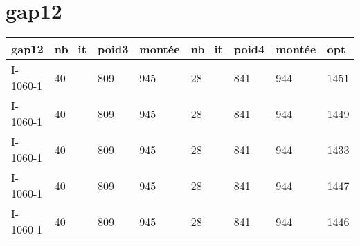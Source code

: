 \documentclass[a4paper,12pt,titlepage]{report}
\begin{document}
\section{gap12}

\begin{tabular}{|l|l|l|l|l|l|l|l|}
  \hline
  gap12 & nb\_it & poid3 & montée & nb\_it & poid4 & montée & opt \\
  \hline
  I-1060-1 & 40 & 809 & 945 & 28 & 841 & 944 & 1451  \\
  I-1060-1 & 40 & 809 & 945 & 28 & 841 & 944 & 1449  \\
  I-1060-1 & 40 & 809 & 945 & 28 & 841 & 944 & 1433  \\
  I-1060-1 & 40 & 809 & 945 & 28 & 841 & 944 & 1447  \\
  I-1060-1 & 40 & 809 & 945 & 28 & 841 & 944 & 1446  \\
  \hline
\end{tabular}
\end{document}
